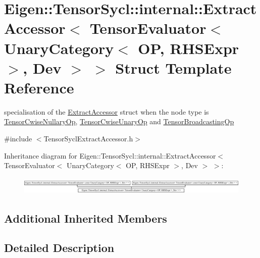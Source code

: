 \hypertarget{struct_eigen_1_1_tensor_sycl_1_1internal_1_1_extract_accessor_3_01_tensor_evaluator_3_01_unary_ced118e7150af1b3484bed90bd93eaab6}{}\section{Eigen\+:\+:Tensor\+Sycl\+:\+:internal\+:\+:Extract\+Accessor$<$ Tensor\+Evaluator$<$ Unary\+Category$<$ OP, R\+H\+S\+Expr $>$, Dev $>$ $>$ Struct Template Reference}
\label{struct_eigen_1_1_tensor_sycl_1_1internal_1_1_extract_accessor_3_01_tensor_evaluator_3_01_unary_ced118e7150af1b3484bed90bd93eaab6}


specialisation of the \hyperlink{struct_eigen_1_1_tensor_sycl_1_1internal_1_1_extract_accessor}{Extract\+Accessor} struct when the node type is \hyperlink{class_eigen_1_1_tensor_cwise_nullary_op}{Tensor\+Cwise\+Nullary\+Op}, \hyperlink{class_eigen_1_1_tensor_cwise_unary_op}{Tensor\+Cwise\+Unary\+Op} and \hyperlink{class_eigen_1_1_tensor_broadcasting_op}{Tensor\+Broadcasting\+Op}  




{\ttfamily \#include $<$Tensor\+Sycl\+Extract\+Accessor.\+h$>$}

Inheritance diagram for Eigen\+:\+:Tensor\+Sycl\+:\+:internal\+:\+:Extract\+Accessor$<$ Tensor\+Evaluator$<$ Unary\+Category$<$ OP, R\+H\+S\+Expr $>$, Dev $>$ $>$\+:\begin{figure}[H]
\begin{center}
\leavevmode
\includegraphics[height=0.842105cm]{struct_eigen_1_1_tensor_sycl_1_1internal_1_1_extract_accessor_3_01_tensor_evaluator_3_01_unary_ced118e7150af1b3484bed90bd93eaab6}
\end{center}
\end{figure}
\subsection*{Additional Inherited Members}


\subsection{Detailed Description}

